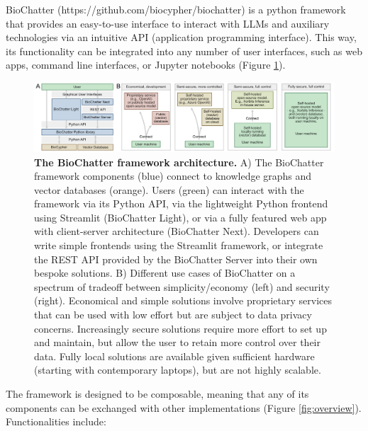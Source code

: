 BioChatter (https://github.com/biocypher/biochatter) is a python framework that provides an easy-to-use interface to interact with LLMs and auxiliary technologies via an intuitive API (application programming interface).
This way, its functionality can be integrated into any number of user interfaces, such as web apps, command line interfaces, or Jupyter notebooks (Figure \ref{fig:architecture}).

\begin{figure}
\hypertarget{fig:architecture}{%
\centering
\includegraphics{images/biochatter_architecture.png}
\caption{\textbf{The BioChatter framework architecture.}
A) The BioChatter framework components (blue) connect to knowledge graphs and vector databases (orange).
Users (green) can interact with the framework via its Python API, via the lightweight Python frontend using Streamlit (BioChatter Light), or via a fully featured web app with client-server architecture (BioChatter Next).
Developers can write simple frontends using the Streamlit framework, or integrate the REST API provided by the BioChatter Server into their own bespoke solutions.
B) Different use cases of BioChatter on a spectrum of tradeoff between simplicity/economy (left) and security (right).
Economical and simple solutions involve proprietary services that can be used with low effort but are subject to data privacy concerns.
Increasingly secure solutions require more effort to set up and maintain, but allow the user to retain more control over their data.
Fully local solutions are available given sufficient hardware (starting with contemporary laptops), but are not highly scalable.}\label{fig:architecture}
}
\end{figure}

The framework is designed to be composable, meaning that any of its components can be exchanged with other implementations (Figure \ref{fig:overview}).
Functionalities include:


